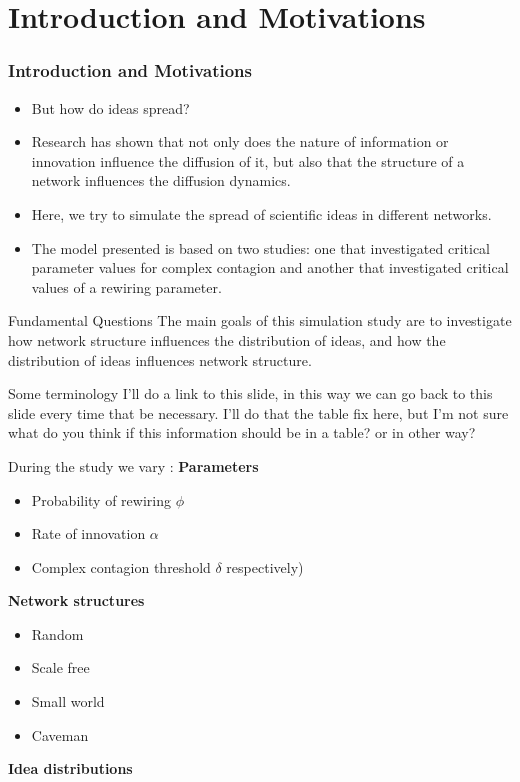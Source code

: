 \documentclass{beamer}
\begin{document}
\section {Introduction and Motivations}
\begin{frame}
\frametitle{Introduction and Motivations}
\begin{itemize}
\item But how do ideas spread? \pause
\item Research has shown that not only does the nature of information or innovation influence the diffusion of it, but also that the structure of a network influences the diffusion dynamics. \pause
\end{itemize}
\end{frame}
%
\begin{frame}
\begin{itemize}
\item Here, we try to simulate the spread of scientific ideas in different networks. \pause
\item The model presented is based on two studies: one that investigated critical parameter values for complex contagion and another that investigated critical values of a rewiring parameter.\pause
\end{itemize}
\end{frame}
%
\begin{frame}
{Fundamental Questions}
The main goals of this simulation study are to investigate how network structure influences the distribution of ideas, and how the distribution of ideas influences network structure.
\end{frame}
%
\begin{frame}
{Some terminology}
\alert {I'll do a link to this slide, in this way we can go back to this slide every time that be necessary. I'll do that the table fix here, but I'm not sure what do you think if this information should be in a table? or in other way?}

\end{frame}
%
\begin{frame}
During the study we vary :
\textbf{Parameters}
\begin{itemize}
\item Probability of rewiring $\phi$
\item Rate of innovation $\alpha$
\item Complex contagion threshold  $\delta$ respectively) 
\end{itemize}
\textbf{Network structures}
\begin{itemize}
\item Random
\item Scale free
\item Small world
\item Caveman
\end{itemize}
\textbf{Idea distributions}
\end{frame}
\end{document}
